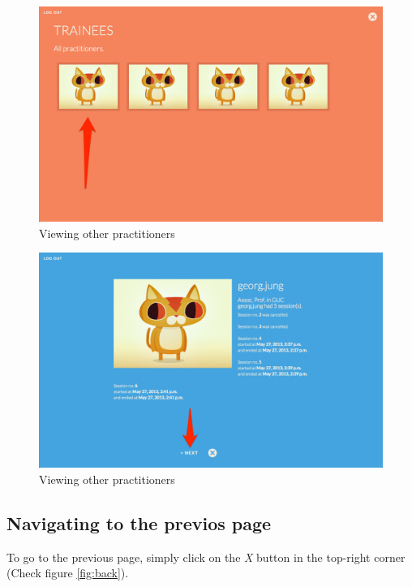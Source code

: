 \begin{figure}[htbp]
\centering 
\includegraphics[width=1.0\linewidth]{steps/Trainees2} 
\caption{Viewing other practitioners} 
\label{fig:trainees2} 
\end{figure} 

\begin{figure}[htbp]
\centering 
\includegraphics[width=1.0\linewidth]{steps/Trainees3} 
\caption{Viewing other practitioners} 
\label{fig:trainees3} 
\end{figure} 

\subsection{Navigating to the previos page}
To go to the previous page, simply click on the \emph{X} button in the top-right corner (Check figure \ref{fig:back}).

